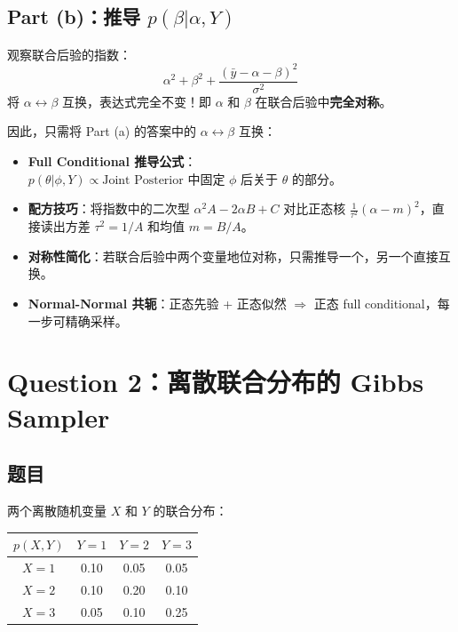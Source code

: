 \documentclass[11pt,a4paper]{article}
\begin{document}
\subsection*{Part (b)：推导 $p(\beta | \alpha, Y)$}

观察联合后验的指数：
$$\alpha^2 + \beta^2 + \frac{(\bar{y} - \alpha - \beta)^2}{\sigma^2}$$
将 $\alpha \leftrightarrow \beta$ 互换，表达式完全不变！即 $\alpha$ 和 $\beta$ 在联合后验中\textbf{完全对称}。

因此，只需将 Part (a) 的答案中的 $\alpha \leftrightarrow \beta$ 互换：

\begin{center}
\end{center}

\begin{knowledgebox}[Q1 知识点总结]
\begin{itemize}
    \item \textbf{Full Conditional 推导公式}：$p(\theta | \phi, Y) \propto \text{Joint Posterior 中固定 $\phi$ 后关于 $\theta$ 的部分}$。
    \item \textbf{配方技巧}：将指数中的二次型 $\alpha^2 A - 2\alpha B + C$ 对比正态核 $\frac{1}{\tau^2}(\alpha - m)^2$，直接读出方差 $\tau^2 = 1/A$ 和均值 $m = B/A$。
    \item \textbf{对称性简化}：若联合后验中两个变量地位对称，只需推导一个，另一个直接互换。
    \item \textbf{Normal-Normal 共轭}：正态先验 + 正态似然 $\Rightarrow$ 正态 full conditional，每一步可精确采样。
\end{itemize}
\end{knowledgebox}

\vspace{0.5cm}

\section*{Question 2：离散联合分布的 Gibbs Sampler}

\subsection*{题目}

两个离散随机变量 $X$ 和 $Y$ 的联合分布：
\begin{center}
\begin{tabular}{c|ccc}
$p(X,Y)$ & $Y=1$ & $Y=2$ & $Y=3$ \\
\hline
$X=1$ & 0.10 & 0.05 & 0.05 \\
$X=2$ & 0.10 & 0.20 & 0.10 \\
$X=3$ & 0.05 & 0.10 & 0.25
\end{tabular}
\end{center}
\end{document}
